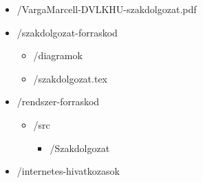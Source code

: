 \documentclass[a4paper,12pt,oneside]{report}
\begin{document}
\begin{itemize}
    \item[] /VargaMarcell-DVLKHU-szakdolgozat.pdf
    \item[] /szakdolgozat-forraskod
    \begin{itemize}
        \item[] /diagramok
        \item[] /szakdolgozat.tex
    \end{itemize}
    
    \item[] /rendszer-forraskod
    \begin{itemize}
        \item[] /src
        \begin{itemize}
            \item[] /Szakdolgozat
        \end{itemize}
        
    \end{itemize}
    
    \item[] /internetes-hivatkozasok

\end{itemize}
\end{document}
